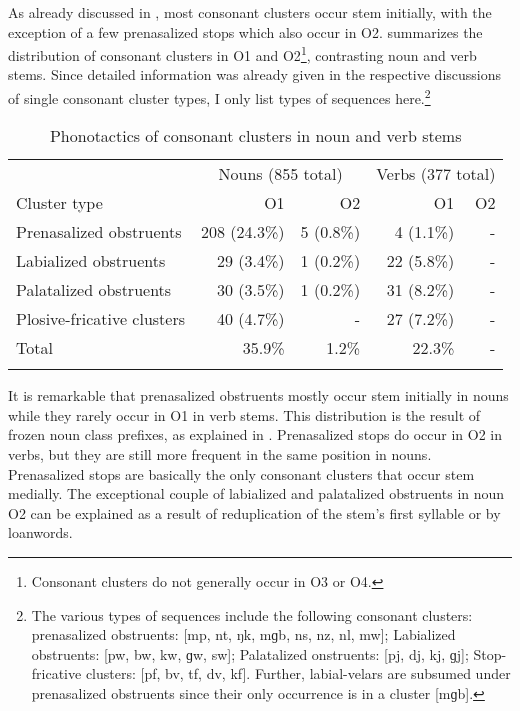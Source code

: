 As already discussed in , most consonant clusters occur stem initially, with the exception of a few prenasalized stops which also occur in O2.  summarizes the distribution of consonant clusters in O1 and O2\footnote{Consonant clusters do not generally occur in O3 or O4.}, contrasting noun and verb stems. Since detailed information was already given in the respective discussions of single consonant cluster types, I only list types of sequences here.\footnote{The various types of sequences include the following consonant clusters: prenasalized obstruents: [mp, nt, ŋk, mɡb, ns, nz, nl, mw]; Labialized obstruents: [pw, bw, kw, ɡw, sw]; Palatalized onstruents: [pj, dj, kj, ɡj]; Stop-fricative clusters: [pf, bv, tf, dv, kf]. Further,  labial-velars are subsumed under prenasalized obstruents since their only occurrence is in a cluster [mɡb].}

\begin{table}
\begin{tabular}{lrrrr}
\lsptoprule
 & \multicolumn{2}{c}{Nouns (855 total)}  & \multicolumn{2}{c}{Verbs (377 total)}\\\cmidrule(lr){2-3}\cmidrule(lr){4-5}
Cluster type & O1 & O2 & O1 & O2 \\  \midrule
Prenasalized obstruents & 208 (24.3\%) & 5 (0.8\%) & 4 (1.1\%) & - \\
Labialized obstruents & 29 (3.4\%) & 1 (0.2\%)  & 22 (5.8\%) & - \\
Palatalized obstruents & 30 (3.5\%) & 1 (0.2\%) & 31 (8.2\%) & - \\
Plosive-fricative clusters & 40 (4.7\%) & - & 27 (7.2\%) & - \\  \midrule
{Total} & {35.9\%} & {1.2\%} & {22.3\%} & - \\  \lspbottomrule
\end{tabular}
\caption{Phonotactics of consonant clusters in noun and verb stems}
\label{Tab:CClust}
\end{table}

It is remarkable that prenasalized obstruents mostly occur stem initially in nouns while they rarely occur in O1 in verb stems. This distribution is the result of frozen noun class prefixes, as explained in . Prenasalized stops do occur in O2 in verbs, but they are still more frequent in the same position in nouns. Prenasalized stops are basically the only consonant clusters that occur stem medially. The exceptional couple of labialized and palatalized obstruents in noun O2 can be explained as a result of reduplication of the stem's first syllable or by loanwords.


